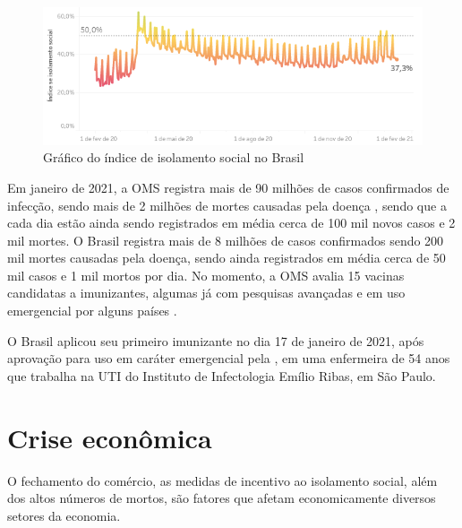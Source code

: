 \begin{figure}[htb]
    \centering
    \caption{Gráfico do índice de isolamento social no Brasil}
    \label{fig:intro-1.1-isolamento-social-brasil}
    \includegraphics[scale=0.7]{images/intro-1.1-isolamento-social-brasil.png}
\end{figure}

Em janeiro de 2021, a OMS registra mais de 90 milhões de casos confirmados de infecção, sendo mais de 2 milhões de mortes causadas pela doença \cite{oms:coronavirus-disease-dashboard}, sendo que a cada dia estão ainda sendo registrados em média cerca de 100 mil novos casos e 2 mil mortes. O Brasil registra mais de 8 milhões de casos confirmados sendo 200 mil mortes causadas pela doença, sendo ainda registrados em média cerca de 50 mil casos e 1 mil mortos por dia. No momento, a OMS avalia 15 vacinas candidatas a imunizantes, algumas já com pesquisas avançadas e em uso emergencial por alguns países \cite{oms:coronavirus-vaccines-status}.

O Brasil aplicou seu primeiro imunizante \cite{artigo:folha:primeira-vacina} no dia 17 de janeiro de 2021, após aprovação para uso em caráter emergencial pela , em uma enfermeira de 54 anos que trabalha na UTI do Instituto de Infectologia Emílio Ribas, em São Paulo.

\section{Crise econômica}
\label{introducao:crise-economica}

O fechamento do comércio, as medidas de incentivo ao isolamento social, além dos altos números de mortos, são fatores que afetam economicamente diversos setores da economia.

